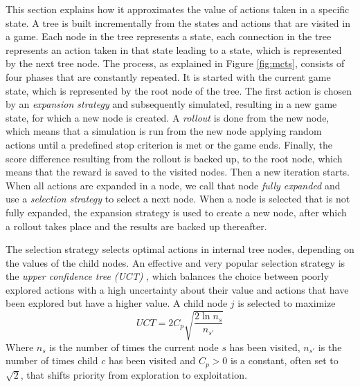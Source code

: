 This section explains how it approximates the value of actions taken in a
specific state. A tree is built incrementally from the states and actions that
are visited in a game. Each node in the tree represents a state, each connection
in the tree represents an action taken in that state leading to a state, which
is represented by the next tree node.  The process, as explained in Figure
\ref{fig:mcts}, consists of four phases that are constantly repeated. It is
started with the current game state, which is represented by the root node of
the tree. The first action is chosen by an \emph{expansion strategy} and
subsequently simulated, resulting in a new game state, for which a new node is
created. A \emph{rollout} is done from the new node, which means that a
simulation is run from the new node applying random actions until a predefined
stop criterion is met or the game ends. Finally, the score difference resulting
from the rollout is backed up, to the root node, which means that the reward is
saved to the visited nodes. Then a new iteration starts. When all actions are
expanded in a node, we call that node \emph{fully expanded} and use a
\emph{selection strategy} to select a next node. When a node is selected that is
not fully expanded, the expansion strategy is used to create a new node, after
which a rollout takes place and the results are backed up thereafter.

The selection strategy selects optimal actions in internal tree nodes, depending
on the values of the child nodes. An effective and very popular selection
strategy is the \emph{upper confidence tree (UCT)} \cite{kocsis2006bandit},
which balances the choice between poorly explored actions with a high
uncertainty about their value and actions that have been explored but have a
higher value. A child node $j$ is selected to maximize
\begin{equation}
	\label{eq:uct}
	UCT = 2C_p \sqrt{\frac{2 \ln n_s}{n_{s'}}}
\end{equation}
Where $n_s$ is the number of times the current node $s$ has been visited,
$n_{s'}$ is the number of times child $c$ has been visited and $C_p > 0$ is a
constant, often set to $\sqrt{2}$, that shifts priority from exploration to
exploitation.


